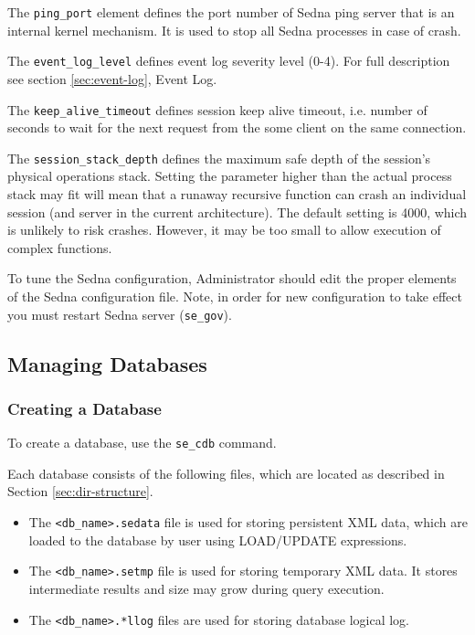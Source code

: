 \documentclass[a4paper,12pt]{article}
\begin{document}
The \verb!ping_port! element defines the port number of Sedna ping server that
is an internal kernel mechanism. It is used to stop all Sedna processes in case
of crash.

The \verb!event_log_level! defines event log severity level (0-4). For full
description see section \ref{sec:event-log}, Event Log.

The \verb!keep_alive_timeout! defines session keep alive timeout, i.e. number of
seconds to wait for the next request from the some client on the same
connection.

The \verb!session_stack_depth! defines the maximum safe depth of the session's
physical operations stack. Setting the parameter higher than the actual process
stack may fit will mean that a runaway recursive function can crash an
individual session (and server in the current architecture). The default setting
is 4000, which is unlikely to risk crashes. However, it may be too small to
allow execution of complex functions.

To tune the Sedna configuration, Administrator should edit the proper elements
of the Sedna configuration file. Note, in order for new configuration to take
effect you must restart Sedna server (\verb!se_gov!).


\subsection{Managing Databases}
\subsubsection{Creating a Database}
\label{CreateDB}

To create a database, use the \verb!se_cdb! command.

Each database consists of the following files, which are located as described
in Section \ref{sec:dir-structure}.

\begin{itemize}
\item The \verb!<db_name>.sedata! file is used for storing persistent XML data,
which are loaded to the database by user using LOAD/UPDATE expressions.
\item The \verb!<db_name>.setmp! file is used for storing temporary XML data.
It stores intermediate results and size may grow during query execution.
\item The \verb!<db_name>.*llog! files are used for storing database logical
log.
\end{itemize}
\end{document}
